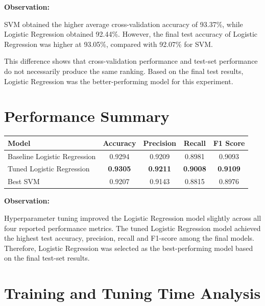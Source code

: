 \documentclass[12pt,a4paper]{article}
\begin{document}
\textbf{Observation:}

SVM obtained the higher average cross-validation accuracy of 93.37\%,
while Logistic Regression obtained 92.44\%. However, the final test
accuracy of Logistic Regression was higher at 93.05\%, compared with
92.07\% for SVM.

This difference shows that cross-validation performance and test-set
performance do not necessarily produce the same ranking. Based on the
final test results, Logistic Regression was the better-performing
model for this experiment.


\section{Performance Summary}

\begin{longtable}{|p{5cm}|c|c|c|c|}
\hline
\textbf{Model} &
\textbf{Accuracy} &
\textbf{Precision} &
\textbf{Recall} &
\textbf{F1 Score}
\\ \hline

Baseline Logistic Regression &
0.9294 &
0.9209 &
0.8981 &
0.9093
\\ \hline

Tuned Logistic Regression &
\textbf{0.9305} &
\textbf{0.9211} &
\textbf{0.9008} &
\textbf{0.9109}
\\ \hline

Best SVM &
0.9207 &
0.9143 &
0.8815 &
0.8976
\\ \hline

\end{longtable}

\textbf{Observation:}

Hyperparameter tuning improved the Logistic Regression model slightly
across all four reported performance metrics. The tuned Logistic
Regression model achieved the highest test accuracy, precision, recall
and F1-score among the final models. Therefore, Logistic Regression was
selected as the best-performing model based on the final test-set
results.


\section{Training and Tuning Time Analysis}
\end{document}
